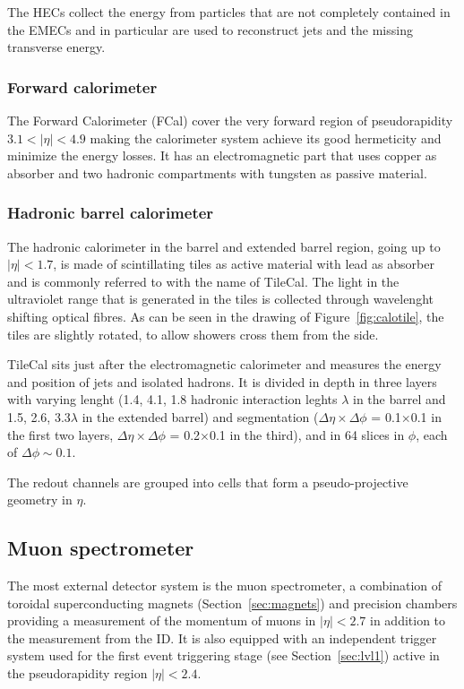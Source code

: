 The HECs collect the energy from particles that are not completely contained
in the EMECs and in particular are used to reconstruct jets and the missing transverse
energy.

\subsubsection{Forward calorimeter}\label{sec:calforward}

The Forward Calorimeter (FCal) cover the very forward region of pseudorapidity
$3.1<|\eta|<4.9$ making the calorimeter system achieve its good hermeticity
and minimize the energy losses.
It has an electromagnetic part that uses copper as absorber and two hadronic compartments
with tungsten as passive material. 


\subsubsection{Hadronic barrel calorimeter}\label{sec:hadcalbarrel}

The hadronic calorimeter in the barrel and extended barrel region, going up to
$|\eta|<1.7$, is made of scintillating tiles as active material with lead as absorber
and is commonly referred to with the name of TileCal. 
The light in the ultraviolet range that is generated in the tiles is collected through
wavelenght shifting optical fibres. As can be seen in the drawing of Figure~\ref{fig:calotile},
the tiles are slightly rotated, to allow showers cross them from the side.

TileCal sits just after the electromagnetic
calorimeter and measures the energy and position of jets and isolated hadrons.
It is divided in depth in three layers with varying lenght (1.4, 4.1, 1.8 hadronic interaction
leghts $\lambda$ in the barrel and 1.5, 2.6, 3.3$\lambda$ in the extended barrel) and segmentation
($\Delta\eta\times\Delta\phi$ = 0.1$\times$0.1 in the first two layers,
$\Delta\eta\times\Delta\phi$ = 0.2$\times$0.1 in the third),
and in 64 slices in $\phi$, each of $\Delta\phi\sim0.1$.

The redout channels are grouped into cells that form a pseudo-projective geometry in $\eta$.


\subsection{Muon spectrometer}\label{sec:muonspec}

The most external detector system is the muon spectrometer, a combination
of toroidal superconducting magnets (Section~\ref{sec:magnets}) and precision
chambers providing a measurement of the momentum of muons in $|\eta|<2.7$ in addition
to the measurement from the ID. It is also equipped 
with an independent trigger system used for the first event triggering
stage (see Section~\ref{sec:lvl1}) active in the pseudorapidity region $|\eta|<2.4$. 

